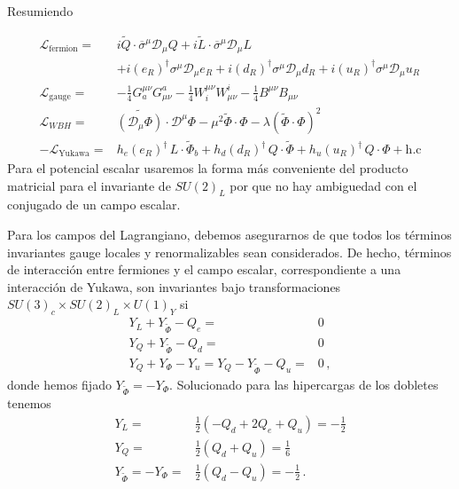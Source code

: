 \begin{frame}
Resumiendo

\begin{align}
  \label{eq:smscalar}
\mathcal{L}_{\text{fermion}}=&i\widetilde{Q}\cdot \overline{\sigma}^\mu\mathcal{D}_\mu Q+i\widetilde{L}\cdot \overline{\sigma}^\mu\mathcal{D}_\mu L \nonumber\\
&+i(e_R)^{\dagger}\sigma^\mu\mathcal{D}_\mu {e_R}+i(d_R)^{\dagger}\sigma^\mu\mathcal{D}_\mu {d_R}+i(u_R)^{\dagger}\sigma^\mu\mathcal{D}_\mu {u_R}\nonumber\\
\mathcal{L}_{\text{gauge}}=& -\tfrac{1}{4}G^{\mu\nu}_a G_{\mu\nu}^a-\tfrac{1}{4}W^{\mu\nu}_i W_{\mu\nu}^i-\tfrac{1}{4}B^{\mu\nu} B_{\mu\nu}\nonumber\\
  \mathcal{L}_{WBH}=&\widetilde{\left( \mathcal{D}_\mu{\Phi} \right)}\cdot\mathcal{D}^\mu\Phi-\mu^2\widetilde{\Phi}\cdot\Phi-\lambda \left( \widetilde{\Phi}\cdot\Phi \right)^2 \nonumber\\
-\mathcal{L}_{\text{Yukawa}}=&  h_e \left( e_R \right)^{\dagger}\,L\cdot \widetilde{\Phi}_b +
      h_d \left( d_R \right)^{\dagger}\,Q\cdot \widetilde{\Phi} +
      h_u \left( u_R \right)^{\dagger}\,Q\cdot {\Phi}+\text{h.c}
\end{align}
Para el potencial escalar usaremos la forma más conveniente del producto matricial para el invariante de $SU(2)_L$ por que no hay ambiguedad con el conjugado de un campo escalar. 

Para los campos del Lagrangiano, debemos asegurarnos de que todos los términos invariantes gauge locales y renormalizables sean considerados. De hecho, términos de interacción entre fermiones y el campo escalar, correspondiente a una interacción de Yukawa, son invariantes bajo transformaciones $SU(3)_c\times  SU(2)_L\times  U(1)_Y$ si
\begin{align*}
  Y_L+Y_{\widetilde{\Phi}}-Q_{e}=&0\\
  Y_Q+Y_{\widetilde{\Phi}}-Q_{d}=&0\\
  Y_Q+Y_{\Phi}-Y_{u}=Y_Q-Y_{\widetilde{\Phi}}-Q_{u}=&0\,,
\end{align*}
donde hemos fijado $Y_{\widetilde{\Phi}}=-Y_\Phi$. Solucionado para las hipercargas de los dobletes tenemos
\begin{align}
\label{eq:yyy}
Y_L=&\frac{1}{2}\left( -Q_d+2Q_e+Q_u \right)=-\frac{1}{2}  \nonumber\\
Y_Q=&\frac{1}{2}\left( Q_d+Q_u \right)=\frac{1}{6} \nonumber\\
Y_{\widetilde{\Phi}}=-Y_{\Phi}=&\frac{1}{2}\left( Q_d-Q_u \right)=-\frac{1}{2}\,.
\end{align}


\end{frame}
